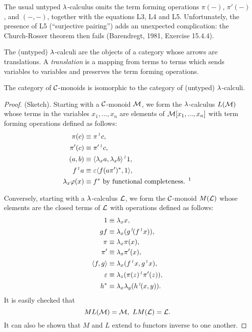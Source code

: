 The usual untyped $\lambda$-calculus omits the term forming operations $\pi(-)$,
$\pi'(-)$, and $(-,-)$, together with the equations L3, L4 and L5. Unfortunately,
the presence of L5 (``surjective pairing'') adds an unexpected complication:
the Church-Rosser theorem then fails (Barendregt, 1981, Exercise 15.4.4).

The (untyped) $\lambda$-calculi are the objects of a category whose arrows are
translations. A {\em translation} is a mapping from terms to terms which sends
variables to variables and preserves the term forming operations.

\begin{thm}
The category of $\mathcal C$-monoids is isomorphic to the category of
(untyped) $\lambda$-calculi.
\end{thm}

\begin{proof}
(Sketch). Starting with a $\mathcal C$-monoid ${\mathcal M}$, we form the $\lambda$-calculus
$L({\mathcal M})$ whose terms in the variables $x_1, ... , x_n$ are elements of ${\mathcal M}[x_1,...,x_n]$
with term forming operations defined as follows:
\begin{align*}
\pi(c) & \equiv \pi \app c,\\
\pi' (c) & \equiv \pi' \app c,\\
(a,b) & \equiv \la \lx a, \lx b\ra \app 1,\\
f \app a & \equiv \ev \la f(a \pi')^*,1 \ra,\\
\lx \pf(x) &\equiv f^* \,\, \text{by functional completeness.%
\footnotemark}
\end{align*}

Conversely, starting with a $\lambda$-calculus ${\mathcal L}$, we form the $\mathcal C$-monoid $M({\mathcal L})$
whose elements are the closed terms of ${\mathcal L}$ with operations defined as follows:
\begin{align*}
1 &\equiv \lambda_x x,\\
gf &\equiv \lambda_x (g\mathop{{}^\wr}\kern-.8pt (f\mathop{{}^\wr}\kern-.8pt x)),\\
\pi & \equiv \lambda_x \pi(x),\\
\pi' & \equiv \lambda_x \pi'(x),\\
\langle f,g \rangle &\equiv \lambda_x (f\mathop{{}^\wr}\kern-.8pt x, g \mathop{{}^\wr}\kern-.8pt x),\\
\varepsilon & \equiv \lambda_z (\pi(z) \mathop{{}^\wr}\kern-.8pt \pi'(z)),\\
h^* & \equiv \lambda_x\lambda_y(h \mathop{{}^\wr}\kern-.8pt (x,y)).
\end{align*}
It is easily checked that
\[
ML({\mathcal M}) = {\mathcal M}, \,\, LM({\mathcal L}) = {\mathcal L}.
\]
It can also be shown that $M$ and $L$ extend to functors inverse to one
another.
\end{proof}

